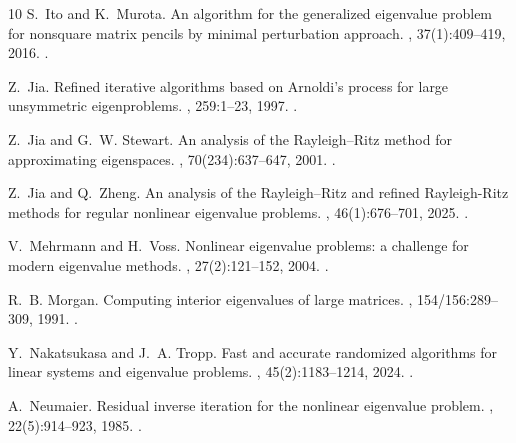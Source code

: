 \documentclass[a4paper,11pt]{article}
\begin{document}
\begin{thebibliography}{10}
S.~Ito and K.~Murota.
\newblock An algorithm for the generalized eigenvalue problem for nonsquare matrix pencils by minimal perturbation approach.
, 37(1):409--419, 2016.
\newblock \href {https://doi.org/10.1137/14099231X} {}.

Z.~Jia.
\newblock Refined iterative algorithms based on {A}rnoldi's process for large unsymmetric eigenproblems.
, 259:1--23, 1997.
\newblock \href {https://doi.org/10.1016/S0024-3795(96)00238-8} {}.

Z.~Jia and G.~W. Stewart.
\newblock An analysis of the {R}ayleigh--{R}itz method for approximating eigenspaces.
, 70(234):637--647, 2001.
\newblock \href {https://doi.org/10.1090/S0025-5718-00-01208-4} {}.

Z.~Jia and Q.~Zheng.
\newblock An analysis of the {R}ayleigh--{R}itz and refined {R}ayleigh-{R}itz methods for regular nonlinear eigenvalue problems.
, 46(1):676--701, 2025.
\newblock \href {https://doi.org/10.1137/23M161392X} {}.

V.~Mehrmann and H.~Voss.
\newblock Nonlinear eigenvalue problems: a challenge for modern eigenvalue methods.
, 27(2):121--152, 2004.
\newblock \href {https://doi.org/10.1002/gamm.201490007} {}.

R.~B. Morgan.
\newblock Computing interior eigenvalues of large matrices.
, 154/156:289--309, 1991.
\newblock \href {https://doi.org/10.1016/0024-3795(91)90381-6} {}.

Y.~Nakatsukasa and J.~A. Tropp.
\newblock Fast and accurate randomized algorithms for linear systems and eigenvalue problems.
, 45(2):1183--1214, 2024.
\newblock \href {https://doi.org/10.1137/23M1565413} {}.

A.~Neumaier.
\newblock Residual inverse iteration for the nonlinear eigenvalue problem.
, 22(5):914--923, 1985.
\newblock \href {https://doi.org/10.1137/0722055} {}.


\end{thebibliography}
\end{document}
